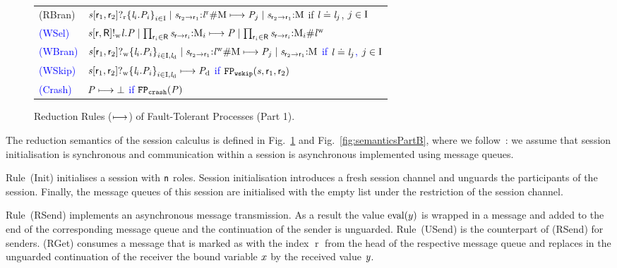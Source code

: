 \begin{figure}[tp]
\begin{tabular}{ll}
		(\textsf{RBran}) & $ \PBranR{\Chan}{\Role_1}{\Role_2}{\Set{ \Label_i.\PT_i }_{i \in \indexSet}} \mid \MQ{\Chan}{\Role_2}{\Role_1}{\MessBR{\Label}\#\Queue} \step \PT_j \mid \MQ{\Chan}{\Role_2}{\Role_1}{\Queue} $ \hfill if $ \Label \compL \Label_j $, $ j \in \indexSet $\\
		\textcolor{blue}{(\textsf{WSel})} & \textcolor{blue}{$ \PSelW{\Chan}{\Role}{\Role[R]}{\Label}{\PT} \mid \prod_{\Role_i \in \Role[R]} \MQ{\Chan}{\Role}{\Role_i}{\Queue_i} \step \PT \mid \prod_{\Role_i \in \Role[R]} \MQ{\Chan}{\Role}{\Role_i}{\Queue_i\#\MessBW{\Label}} $}\\
		\textcolor{blue}{(\textsf{WBran})} & \textcolor{blue}{$ \PBranW{\Chan}{\Role_1}{\Role_2}{\Set{ \Label_i.\PT_i }_{i \in \indexSet, \LabelD}} \mid \MQ{\Chan}{\Role_2}{\Role_1}{\MessBW{\Label}\#\Queue} \step \PT_j \mid \MQ{\Chan}{\Role_2}{\Role_1}{\Queue} $ \hfill if $ \Label \compL \Label_j $, $ j \in \indexSet $}\\
		\textcolor{blue}{(\textsf{WSkip})} & \textcolor{blue}{$ \PBranW{\Chan}{\Role_1}{\Role_2}{\Set{ \Label_i.\PT_i }_{i \in \indexSet, \LabelD}} \step \PTD $ \hfill if $ \fpWSkip(\Chan, \Role_1, \Role_2) $}\\
		\textcolor{blue}{(\textsf{Crash})} & \textcolor{blue}{$ \PT \step \PCrash $ \hfill if $ \fpCrash(\PT) $}
	\end{tabular}
	\vspace*{-0.5em}
	\caption{Reduction Rules ($ \step $) of Fault-Tolerant Processes (Part 1).}
	\label{fig:semanticsPartA}
\end{figure}

The reduction semantics of the session calculus is defined in Fig.~\ref{fig:semanticsPartA} and Fig.~\ref{fig:semanticsPartB}, where we follow~\cite{hondaYoshidaCarbone16}: we assume that session initialisation is synchronous and communication within a session is asynchronous implemented using message queues.

Rule~(\textsf{Init}) initialises a session with $ \Role[n] $ roles.
Session initialisation introduces a fresh session channel and unguards the participants of the session.
Finally, the message queues of this session are initialised with the empty list under the restriction of the session channel.

Rule~(\textsf{RSend}) implements an asynchronous \strongR message transmission.
As a result the value $ \Eval{\Expr[y]} $ is wrapped in a message and added to the end of the corresponding message queue and the continuation of the sender is unguarded.
Rule~(\textsf{USend}) is the counterpart of (\textsf{RSend}) for \unrel senders.
%
(\textsf{RGet}) consumes a message that is marked as \strongR with the index $ \operatorname{r} $ from the head of the respective message queue and replaces in the unguarded continuation of the receiver the bound variable $ \Args $ by the received value $ \Args[y] $.

